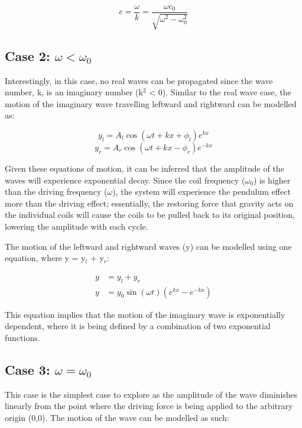 \documentclass[12pt, letterpaper, twoside]{article}
\begin{document}
\begin{equation}
    c = \frac{\omega}{k} = \frac{\omega c_0}{\sqrt{\omega^2 - \omega_0^2}}
\end{equation}

\subsection{Case 2: $\omega < \omega_0$}

Interestingly, in this case, no real waves can be propagated since the wave number, k, is an imaginary number (k$^2$ < 0). Similar to the real wave case, the motion of the imaginary wave travelling leftward and rightward can be modelled as:

\begin{equation*}
    y_l = A_l\cos{(\omega t + kx + \phi_l)}e^{kx}
\end{equation*}
\begin{equation*}
    y_r = A_r\cos{(\omega t + kx - \phi_r)}e^{-kx}
\end{equation*}

Given these equations of motion, it can be inferred that the amplitude of the waves will experience exponential decay. Since the coil frequency ($\omega_0$) is higher than the driving frequency ($\omega$), the system will experience the pendulum effect more than the driving effect; essentially, the restoring force that gravity acts on the individual coils will cause the coils to be pulled back to its original position, lowering the amplitude with each cycle.

The motion of the leftward and rightward waves (y) can be modelled using one equation, where y = y$_l$ + y$_r$:

\begin{align}
    y &= y_l + y_r \\
    y &= y_0\sin{(\omega t)}(e^{kx} - e^{-kx})
\end{align}

This equation implies that the motion of the imaginary wave is exponentially dependent, where it is being defined by a combination of two exponential functions. 

\subsection{Case 3: $\omega = \omega_0$}

This case is the simplest case to explore as the amplitude of the wave diminishes linearly from the point where the driving force is being applied to the arbitrary origin (0,0). The motion of the wave can be modelled as such:
\end{document}
